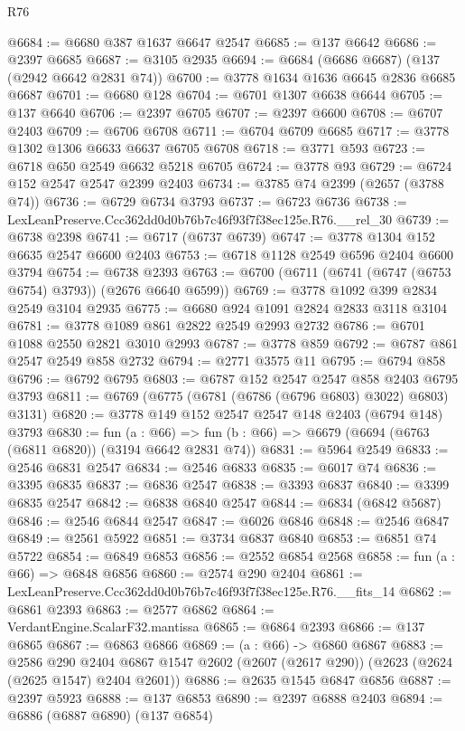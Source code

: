 \begin{lexlean}{R76}
\begin{coremodule}
@6684 := @6680 @387 @1637 @6647 @2547
@6685 := @137 @6642
@6686 := @2397 @6685
@6687 := @3105 @2935
@6694 := @6684 (@6686 @6687) (@137 (@2942 @6642 @2831 @74))
@6700 := @3778 @1634 @1636 @6645 @2836 @6685 @6687
@6701 := @6680 @128
@6704 := @6701 @1307 @6638 @6644
@6705 := @137 @6640
@6706 := @2397 @6705
@6707 := @2397 @6600
@6708 := @6707 @2403
@6709 := @6706 @6708
@6711 := @6704 @6709 @6685
@6717 := @3778 @1302 @1306 @6633 @6637 @6705 @6708
@6718 := @3771 @593
@6723 := @6718 @650 @2549 @6632 @5218 @6705
@6724 := @3778 @93
@6729 := @6724 @152 @2547 @2547 @2399 @2403
@6734 := @3785 @74 @2399 (@2657 (@3788 @74))
@6736 := @6729 @6734 @3793
@6737 := @6723 @6736
@6738 := LexLeanPreserve.Ccc362dd0d0b76b7c46f93f7f38ec125e.R76.__rel_30
@6739 := @6738 @2398
@6741 := @6717 (@6737 @6739)
@6747 := @3778 @1304 @152 @6635 @2547 @6600 @2403
@6753 := @6718 @1128 @2549 @6596 @2404 @6600 @3794
@6754 := @6738 @2393
@6763 := @6700 (@6711 (@6741 (@6747 (@6753 @6754) @3793)) (@2676 @6640 @6599))
@6769 := @3778 @1092 @399 @2834 @2549 @3104 @2935
@6775 := @6680 @924 @1091 @2824 @2833 @3118 @3104
@6781 := @3778 @1089 @861 @2822 @2549 @2993 @2732
@6786 := @6701 @1088 @2550 @2821 @3010 @2993
@6787 := @3778 @859
@6792 := @6787 @861 @2547 @2549 @858 @2732
@6794 := @2771 @3575 @11
@6795 := @6794 @858
@6796 := @6792 @6795
@6803 := @6787 @152 @2547 @2547 @858 @2403 @6795 @3793
@6811 := @6769 (@6775 (@6781 (@6786 (@6796 @6803) @3022) @6803) @3131)
@6820 := @3778 @149 @152 @2547 @2547 @148 @2403 (@6794 @148) @3793
@6830 := fun (a : @66) =>
  fun (b : @66) => @6679 (@6694 (@6763 (@6811 @6820)) (@3194 @6642 @2831 @74))
@6831 := @5964 @2549
@6833 := @2546 @6831 @2547
@6834 := @2546 @6833
@6835 := @6017 @74
@6836 := @3395 @6835
@6837 := @6836 @2547
@6838 := @3393 @6837
@6840 := @3399 @6835 @2547
@6842 := @6838 @6840 @2547
@6844 := @6834 (@6842 @5687)
@6846 := @2546 @6844 @2547
@6847 := @6026 @6846
@6848 := @2546 @6847
@6849 := @2561 @5922
@6851 := @3734 @6837 @6840
@6853 := @6851 @74 @5722
@6854 := @6849 @6853
@6856 := @2552 @6854 @2568
@6858 := fun (a : @66) => @6848 @6856
@6860 := @2574 @290 @2404
@6861 := LexLeanPreserve.Ccc362dd0d0b76b7c46f93f7f38ec125e.R76.__fits_14
@6862 := @6861 @2393
@6863 := @2577 @6862
@6864 := VerdantEngine.ScalarF32.mantissa
@6865 := @6864 @2393
@6866 := @137 @6865
@6867 := @6863 @6866
@6869 := (a : @66) -> @6860 @6867
@6883 := @2586
    @290
    @2404
    @6867
    @1547
    @2602
    (@2607 (@2617 @290))
    (@2623 (@2624 (@2625 @1547) @2404 @2601))
@6886 := @2635 @1545 @6847 @6856
@6887 := @2397 @5923
@6888 := @137 @6853
@6890 := @2397 @6888 @2403
@6894 := @6886 (@6887 @6890) (@137 @6854)

\end{coremodule}
\end{lexlean}
